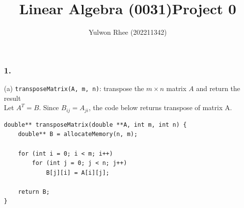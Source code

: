 



\title{Linear Algebra (0031)\newline\space Project 0}
\author{Yulwon Rhee (202211342)}

\maketitle

\subsubsection{1.}
(a) \texttt{transposeMatrix(A, m, n)}: transpose the $m \times n$ matrix $A$ and return the result\\
Let $A^T = B$. Since $B_{ij} = A_{ji}$, the code below returns transpose of matrix A.
\begin{verbatim}
double** transposeMatrix(double **A, int m, int n) {
    double** B = allocateMemory(n, m);

    for (int i = 0; i < m; i++)
        for (int j = 0; j < n; j++)
            B[j][i] = A[i][j];
    
    return B;
}
\end{verbatim}

